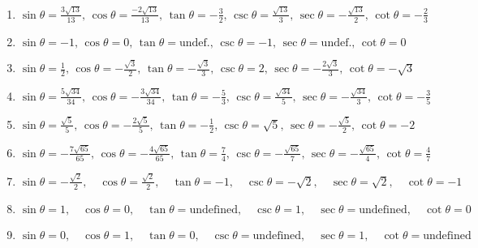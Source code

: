 \begin{enumerate}
	\item $\sin\theta = \frac{3\sqrt{13}}{13}, \, \cos\theta = \frac{-2\sqrt{13}}{13}, \, \tan\theta = -\frac{3}{2}, \, \csc\theta = \frac{\sqrt{13}}{3}, \, \sec\theta = -\frac{\sqrt{13}}{2}, \, \cot\theta = -\frac{2}{3}$

    \item $\sin\theta = -1, \, \cos\theta = 0, \, \tan\theta = \text{undef.}, \, \csc\theta = -1, \, \sec\theta = \text{undef.}, \, \cot\theta = 0$
    
    \item $\sin\theta = \frac{1}{2}, \, \cos\theta = -\frac{\sqrt{3}}{2}, \, \tan\theta = -\frac{\sqrt{3}}{3}, \, \csc\theta = 2, \, \sec\theta = -\frac{2\sqrt{3}}{3}, \, \cot\theta = -\sqrt{3}$
    
    \item $\sin \theta = \frac{5\sqrt{34}}{34}, \, \cos\theta = -\frac{3\sqrt{34}}{34}, \, \tan\theta = -\frac{5}{3}, \, \csc\theta = \frac{\sqrt{34}}{5}, \, \sec\theta = -\frac{\sqrt{34}}{3}, \, \cot\theta=-\frac{3}{5}$
    
     \item $\sin \theta = \frac{\sqrt{5}}{5}, \, \cos\theta = -\frac{2\sqrt{5}}{5}, \, \tan\theta = -\frac{1}{2}, \, \csc\theta = \sqrt{5}, \, \sec\theta = -\frac{\sqrt{5}}{2}, \, \cot\theta=-2$
    
     \item $\sin \theta = -\frac{7\sqrt{65}}{65}, \, \cos\theta = -\frac{4\sqrt{65}}{65}, \, \tan\theta = \frac{7}{4}, \, \csc\theta = -\frac{\sqrt{65}}{7}, \, \sec\theta = -\frac{\sqrt{65}}{4}, \, \cot\theta= \frac{4}{7}$
     
    
    \item $\sin\theta = -\frac{\sqrt{2}}{2}, \quad \cos\theta = \frac{\sqrt{2}}{2}, \quad \tan\theta = -1, \quad \csc\theta = -\sqrt{2}, \quad \sec\theta = \sqrt{2}, \quad \cot\theta = -1$
    
    \item $\sin\theta = 1, \quad \cos\theta = 0, \quad \tan\theta = \text{undefined}, \quad \csc\theta = 1, \quad \sec\theta = \text{undefined}, \quad \cot\theta = 0$
    
    \item $\sin\theta = 0, \quad \cos\theta = 1, \quad \tan\theta = 0, \quad \csc\theta = \text{undefined}, \quad \sec\theta = 1, \quad \cot\theta = \text{undefined}$
    

\end{enumerate}
